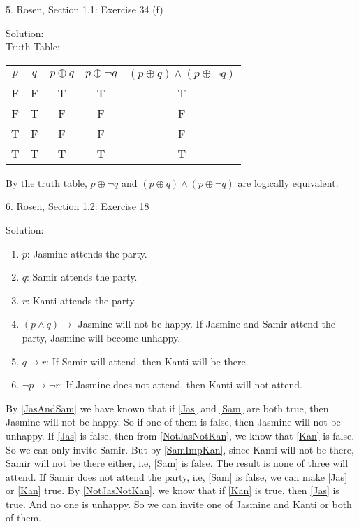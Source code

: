 \documentclass[12pt]{article}
\begin{document}
5. Rosen, Section 1.1: Exercise 34 (f)

\indent Solution:\\
\indent Truth Table:\\
\begin{center}
\begin{tabular}{c|c|c|c|c}
    $p$ & $q$ & $p \oplus q$ & $p \oplus \lnot q$ & $ (p \oplus q) \land (p \oplus \lnot q) $ \\
\hline
F & F & T & T & T \\
F & T & F & F & F \\
T & F & F & F & F \\
T & T & T & T & T \\
\end{tabular}
\end{center}

By the truth table, $p \oplus \lnot q$ and $(p\oplus q)\land(p\oplus \lnot q)$ are logically equivalent.
\newpage

6. Rosen, Section 1.2: Exercise 18 

\indent Solution:\\
\begin{enumerate}
\item \label{Jas} $p$: Jasmine attends the party.
\item \label{Sam} $q$: Samir attends the party.
\item \label{Kan} $r$: Kanti attends the party.
\item \label{JasAndSam} $(p \land q)\to$ Jasmine will not be happy. If Jasmine and Samir attend the party, Jasmine will become unhappy.
\item \label{SamImpKan} $q \to r$: If Samir will attend, then Kanti will be there.
\item \label{NotJasNotKan} $\lnot p \to \lnot r$: If Jasmine does not attend, then Kanti will not attend.
\end{enumerate}

By \ref{JasAndSam} we have known that if \ref{Jas} and \ref{Sam} are both true, then Jasmine will not be happy. So if one of them is false, then Jasmine will not be unhappy. If \ref{Jas} is false, then from \ref{NotJasNotKan}, we know that \ref{Kan}  is false. So we can only invite Samir. But by \ref{SamImpKan}, since Kanti will not be there, Samir will not be there either, i.e, \ref{Sam}  is false. The result is none of three will attend. If Samir does not attend the
party, i.e, \ref{Sam} is false, we can make \ref{Jas}  or \ref{Kan} true. By \ref{NotJasNotKan}, we know that if \ref{Kan} is true, then \ref{Jas} is true. And no one is unhappy. So we can invite one of Jasmine and Kanti or both of them.  
\newpage
\end{document}
